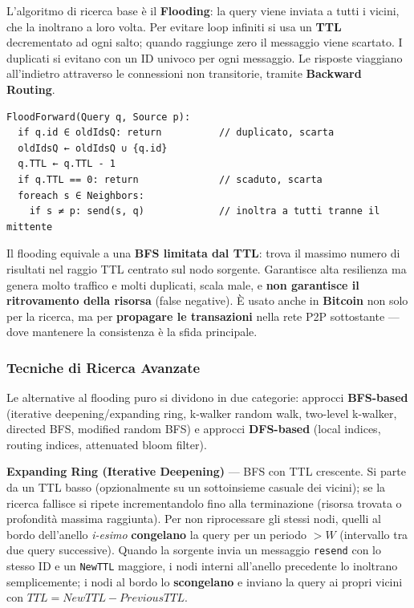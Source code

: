 \documentclass[
  italian,
  openany]{book}
\begin{document}
L'algoritmo di ricerca base è il \textbf{Flooding}: la query viene
inviata a tutti i vicini, che la inoltrano a loro volta. Per evitare
loop infiniti si usa un \textbf{TTL} decrementato ad ogni salto; quando
raggiunge zero il messaggio viene scartato. I duplicati si evitano con
un ID univoco per ogni messaggio. Le risposte viaggiano all'indietro
attraverso le connessioni non transitorie, tramite \textbf{Backward
Routing}.

\begin{verbatim}
FloodForward(Query q, Source p):
  if q.id ∈ oldIdsQ: return          // duplicato, scarta
  oldIdsQ ← oldIdsQ ∪ {q.id}
  q.TTL ← q.TTL - 1
  if q.TTL == 0: return              // scaduto, scarta
  foreach s ∈ Neighbors:
    if s ≠ p: send(s, q)             // inoltra a tutti tranne il mittente
\end{verbatim}

Il flooding equivale a una \textbf{BFS limitata dal TTL}: trova il
massimo numero di risultati nel raggio TTL centrato sul nodo sorgente.
Garantisce alta resilienza ma genera molto traffico e molti duplicati,
scala male, e \textbf{non garantisce il ritrovamento della risorsa}
(false negative). È usato anche in \textbf{Bitcoin} non solo per la
ricerca, ma per \textbf{propagare le transazioni} nella rete P2P
sottostante --- dove mantenere la consistenza è la sfida principale.

\subsubsection{Tecniche di Ricerca
Avanzate}\label{tecniche-di-ricerca-avanzate}

Le alternative al flooding puro si dividono in due categorie: approcci
\textbf{BFS-based} (iterative deepening/expanding ring, k-walker random
walk, two-level k-walker, directed BFS, modified random BFS) e approcci
\textbf{DFS-based} (local indices, routing indices, attenuated bloom
filter).

\textbf{Expanding Ring (Iterative Deepening)} --- BFS con TTL crescente.
Si parte da un TTL basso (opzionalmente su un sottoinsieme casuale dei
vicini); se la ricerca fallisce si ripete incrementandolo fino alla
terminazione (risorsa trovata o profondità massima raggiunta). Per non
riprocessare gli stessi nodi, quelli al bordo dell'anello \emph{i-esimo}
\textbf{congelano} la query per un periodo \(> W\) (intervallo tra due
query successive). Quando la sorgente invia un messaggio \texttt{resend}
con lo stesso ID e un \texttt{NewTTL} maggiore, i nodi interni
all'anello precedente lo inoltrano semplicemente; i nodi al bordo lo
\textbf{scongelano} e inviano la query ai propri vicini con
\(TTL = NewTTL - PreviousTTL\).
\end{document}
